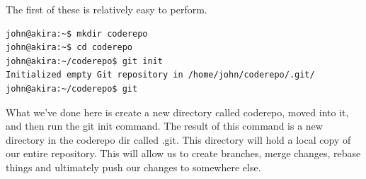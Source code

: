 The first of these is relatively easy to perform.  

\begin{Verbatim}[frame=single,fontsize=\relsize{-3}]
john@akira:~$ mkdir coderepo 
john@akira:~$ cd coderepo 
john@akira:~/coderepo$ git init 
Initialized empty Git repository in /home/john/coderepo/.git/ 
john@akira:~/coderepo$ git 
\end{Verbatim} 

What we've done here is create a new directory called coderepo, moved into it, and then run the git init command.  The result of this command is a new directory in the coderepo dir called .git.  This directory will hold a local copy of our entire repository.  This will allow us to create branches, merge changes, rebase things and ultimately push our changes to somewhere else.

